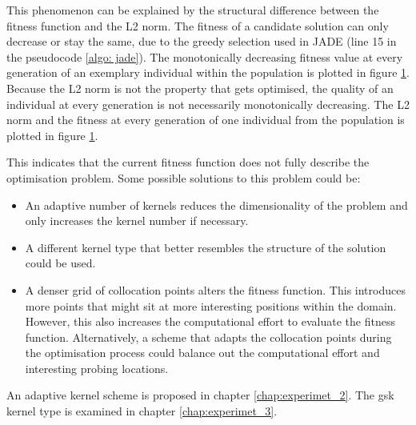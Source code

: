 \documentclass[./\jobname.tex]{subfiles}
\begin{document}
This phenomenon can be explained by the structural difference between the fitness function and the L2 norm. The fitness of a candidate solution can only decrease or stay the same, due to the greedy selection used in JADE (line 15 in the pseudocode \ref{algo: jade}). The monotonically decreasing fitness value at every generation of an exemplary individual within the population is plotted in figure \ref{fig:ex0_pde5_gak_fit_vs_l2}. Because the L2 norm is not the property that gets optimised, the quality of an individual at every generation is not necessarily monotonically decreasing. The L2 norm and the fitness at every generation of one individual from the population is plotted in figure \ref{fig:ex0_pde5_gak_fit_vs_l2}.

\begin{figure}[H]
	\centering
	\noindent{}
	\label{fig:ex0_pde5_gak_fit_vs_l2}
\end{figure}

This indicates that the current fitness function does not fully describe the optimisation problem. Some possible solutions to this problem could be:
\begin{itemize}
	\item An adaptive number of kernels reduces the dimensionality of the problem and only increases the kernel number if necessary. 
	\item A different kernel type that better resembles the structure of the solution could be used. 
	\item A denser grid of collocation points alters the fitness function. This introduces more points that might sit at more interesting positions within the domain. However, this also increases the computational effort to evaluate the fitness function. Alternatively, a scheme that adapts the collocation points during the optimisation process could balance out the computational effort and interesting probing locations.
\end{itemize}

An adaptive kernel scheme is proposed in chapter \ref{chap:experimet_2}. The \gls{gsk} kernel type is examined in chapter \ref{chap:experimet_3}.
\end{document}
